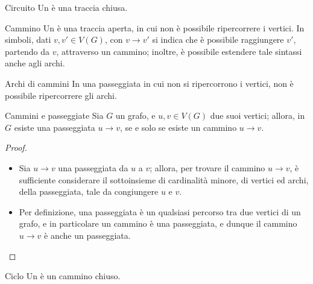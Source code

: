 \documentclass[a4paper, 12pt]{report}
\begin{document}
    \begin{frameddefn}{Circuito}
        Un  è una traccia chiusa.
    \end{frameddefn}

    \begin{frameddefn}{Cammino}
        Un  è una traccia aperta, in cui non è possibile ripercorrere i vertici. In simboli, dati $v, v' \in V(G)$, con $v \rightarrow v'$ si indica che è possibile raggiungere $v'$, partendo da $v$, attraverso un cammino; inoltre, è possibile estendere tale sintassi anche agli archi.
    \end{frameddefn}

    \begin{framedobs}{Archi di cammini}
        In una passeggiata in cui non si ripercorrono i vertici, non è possibile ripercorrere gli archi.
    \end{framedobs}

    \begin{framedthm}[label={cammini e passeggiate}]{Cammini e passeggiate}
        Sia $G$ un grafo, e $u, v \in V(G)$ due suoi vertici; allora, in $G$ esiste una passeggiata $u \rightarrow v$, se e solo se esiste un cammino $u \rightarrow v$.
    \end{framedthm}

    \begin{proof}
        \hspace{0.7cm}
        \begin{itemize}
            \item[]  Sia $u \rightarrow v$ una passeggiata da $u$ a $v$; allora, per trovare il cammino $u \rightarrow v$, è sufficiente considerare il sottoinsieme di cardinalità minore, di vertici ed archi, della passeggiata, tale da congiungere $u$ e $v$.
            \item[]  Per definizione, una passeggiata è un qualsiasi percorso tra due vertici di un grafo, e in particolare un cammino è una passeggiata, e dunque il cammino $u \rightarrow v$ è anche un passeggiata.
        \end{itemize}
    \end{proof}

    \begin{frameddefn}{Ciclo}
        Un  è un cammino chiuso.
    \end{frameddefn}
\end{document}
